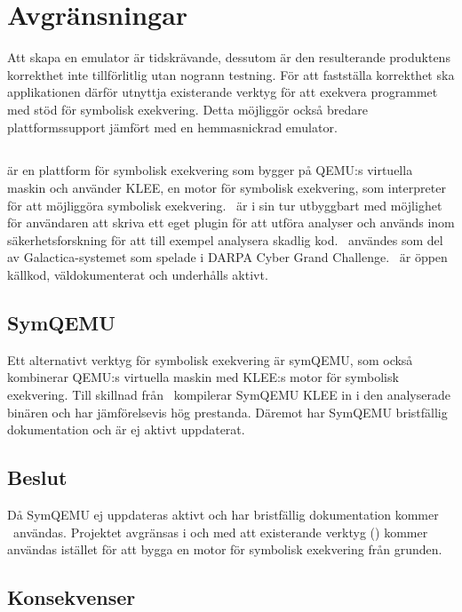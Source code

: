 \section{Avgränsningar}

Att skapa en emulator är tidskrävande, dessutom är den resulterande produktens
korrekthet inte tillförlitlig utan nogrann testning. För att fastställa
korrekthet ska applikationen därför utnyttja existerande verktyg för att
exekvera programmet med stöd för symbolisk exekvering. Detta möjliggör också
bredare plattformssupport jämfört med en hemmasnickrad emulator.

\subsection{\stoe}

\stoe\cite{s2e} är en plattform för symbolisk exekvering som bygger på QEMU:s
virtuella maskin och använder KLEE\cite{klee}, en motor för symbolisk
exekvering, som interpreter för att möjliggöra symbolisk exekvering. \stoe\ är i
sin tur utbyggbart med möjlighet för användaren att skriva ett eget plugin för
att utföra analyser och används inom säkerhetsforskning för att till exempel
analysera skadlig kod. \stoe\ användes som del av Galactica-systemet som spelade
i DARPA Cyber Grand Challenge\cite{s2e_website}. \stoe\ är öppen källkod,
väldokumenterat och underhålls aktivt.

\subsection{SymQEMU}

Ett alternativt verktyg för symbolisk exekvering är symQEMU\cite{symqemu},
som också kombinerar QEMU:s virtuella maskin med KLEE:s motor för symbolisk
exekvering. Till skillnad från \stoe\ kompilerar SymQEMU KLEE in i den
analyserade binären och har jämförelsevis hög prestanda. Däremot har SymQEMU
bristfällig dokumentation och är ej aktivt uppdaterat.

\subsection{Beslut}

Då SymQEMU ej uppdateras aktivt och har bristfällig dokumentation kommer \stoe\
användas. Projektet avgränsas i och med att existerande verktyg (\stoe) kommer
användas istället för att bygga en motor för symbolisk exekvering från grunden.

\subsection{Konsekvenser}

